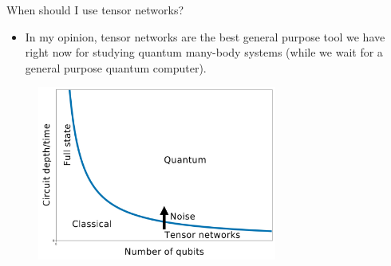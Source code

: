 \begin{frame}{When should I use tensor networks?}

\begin{itemize}[<+->]

  \item In my opinion, tensor networks are the best general purpose tool we have right now for studying quantum many-body systems (while we wait for a general purpose quantum computer).

\end{itemize}

\begin{figure}[T]
  \includegraphics[width=0.7\textwidth]{
    slides/assets/when-tensor-networks-quantum-volume.jpg
  }
\end{figure}

\end{frame}
